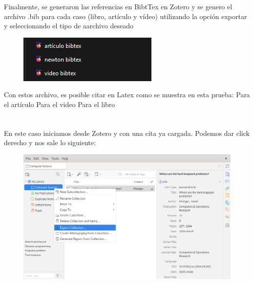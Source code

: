 \documentclass[12pt]{exam}
\begin{document}
Finalmente, se generaron las referencias en BibtTex en Zotero y se genero el archivo .bib para cada caso (libro, artículo y vídeo) utilizando la opción exportar y seleccionando el tipo de aarchivo deseado

\begin{figure}[H]
    \centering
    \includegraphics[width=0.8\linewidth]{Captura de pantalla 2025-09-17 205255.png}
    \label{}
\end{figure}

Con estos archivo, es posible citar en Latex como se muestra en esta prueba:
Para el artículo \cite{sen_gravitational_2025}
Para el video \cite{seabala_feynman_2011}
Para el libro \cite{newton_principios_nodate}




\section{}

\subsection{}

En este caso iniciamos desde Zotero y con una cita ya cargada. Podemos dar click derecho y nos sale lo siguiente:


\begin{figure}[H]
    \centering
    \includegraphics[width=0.8\linewidth]{Figures/section_4_a_p1.png}
    \label{fig:sec_4_a_p1}
\end{figure}
\end{document}
